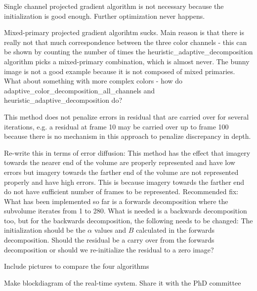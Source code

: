 \begin{todolist}
\begin{todolist}
    \item Single channel projected gradient algorithm is not necessary because the initialization is good enough. Further optimization never happens.
    \item Mixed-primary projected gradient algorihtm sucks. Main reason is that there is really not that much correspondence between the three color channels - this can be shown by counting the number of times the heuristic\_adaptive\_decomposition algorithm picks a mixed-primary combination, which is almost never. The bunny image is not a good example because it is not composed of mixed primaries. What about something with more complex colors - how do adaptive\_color\_decomposition\_all\_channels and heuristic\_adaptive\_decomposition do?
    \item This method does not penalize errors in residual that are carried over for several iterations, e.g. a residual at frame 10 may be carried over up to frame 100 because there is no mechanism in this approach to penalize discrepancy in depth.
    \item Re-write this in terms of error diffusion: This method has the effect that imagery towards the nearer end of the volume are properly represented and have low errors but imagery towards the farther end of the volume are not represented properly and have high errors. This is because imagery towards the farther end do not have sufficient number of frames to be represented. Recommended fix: What has been implemented so far is a forwards decomposition where the subvolume iterates from 1 to 280. What is needed is a backwards decomposition too, but for the backwards decomposition, the following needs to be changed: The initialization should be the $\alpha$ values and $B$ calculated in the forwards decomposition. Should the residual be a carry over from the forwards decomposition or should we re-initialize the residual to a zero image?
    \end{todolist}
\item Include pictures to compare the four algorithms
\item Make blockdiagram of the real-time system. Share it with the PhD committee
\end{todolist}

